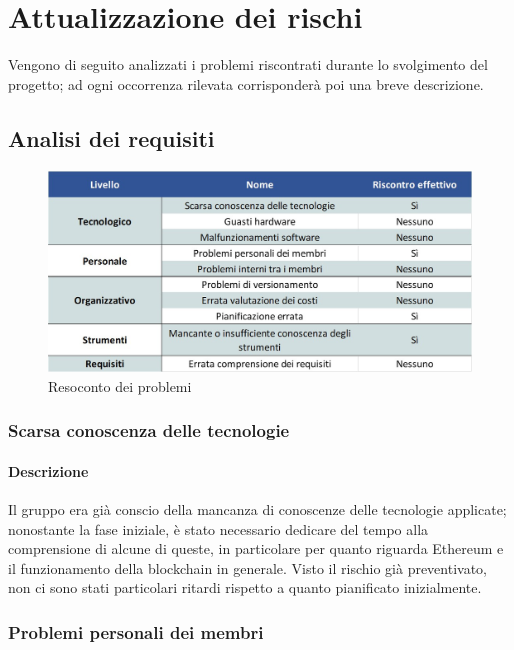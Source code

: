 \newpage

\section{Attualizzazione dei rischi} \label{RiscontroRischi}

Vengono di seguito analizzati i problemi riscontrati durante lo svolgimento del progetto; ad ogni occorrenza rilevata corrisponderà poi una breve descrizione.\\

\subsection{Analisi dei requisiti}
\begin{figure}[h!]
	\centerline{\includegraphics[scale=0.55]{img/RiscontroProblemi.jpg}}
	\caption{Resoconto dei problemi}
	\label{fig:resoconto_probl}
\end{figure}

\subsubsection{Scarsa conoscenza delle tecnologie}
\paragraph {Descrizione}
Il gruppo era già conscio della mancanza di conoscenze delle tecnologie applicate; nonostante la fase iniziale, è stato necessario dedicare del tempo alla comprensione di alcune di queste, in particolare per quanto riguarda Ethereum e il funzionamento della blockchain in generale. Visto il rischio già preventivato, non ci sono stati particolari ritardi rispetto a quanto pianificato inizialmente.

\subsubsection{Problemi personali dei membri}
